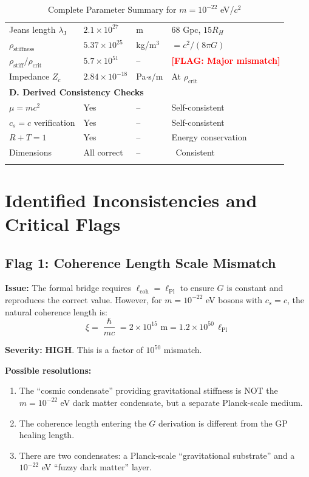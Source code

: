 \documentclass[11pt,a4paper]{article}
\newcommand{\ee}[1]{\times 10^{#1}}
\newcommand{\hbar}{\ensuremath{\hslash}}
\newcommand{\lPl}{\ensuremath{\ell_{\mathrm{Pl}}}}
\newcommand{\rhocrit}{\ensuremath{\rho_{\mathrm{crit}}}}
\newcommand{\lambdaJ}{\ensuremath{\lambda_{\mathrm{J}}}}
\newcommand{\FLAG}[1]{\textcolor{red}{\textbf{[FLAG: #1]}}}
\newcommand{\CONSISTENT}{\textcolor{green!60!black}{\checkmark~Consistent}}
\begin{document}
\begin{longtable}{@{}p{4.5cm}p{3.5cm}p{3cm}p{4cm}@{}}
Jeans length $\lambdaJ$ & $2.1 \ee{27}$ & m & 68 Gpc, $15 R_H$ \\
$\rho_{\mathrm{stiffness}}$ & $5.37 \ee{25}$ & kg/m$^3$ & $= c^2/(8\pi G)$ \\
$\rho_{\mathrm{stiff}}/\rhocrit$ & $5.7 \ee{51}$ & -- & \FLAG{Major mismatch} \\
Impedance $Z_c$ & $2.84 \ee{-18}$ & Pa$\cdot$s/m & At $\rhocrit$ \\
\midrule
\multicolumn{4}{l}{\textbf{D. Derived Consistency Checks}} \\
\midrule
$\mu = mc^2$ & Yes & -- & Self-consistent \\
$c_s = c$ verification & Yes & -- & Self-consistent \\
$R + T = 1$ & Yes & -- & Energy conservation \\
Dimensions & All correct & -- & \CONSISTENT \\
\bottomrule
\caption{Complete Parameter Summary for $m = 10^{-22}$ eV/$c^2$}
\label{tab:summary}
\end{longtable}

\section{Identified Inconsistencies and Critical Flags}
\label{sec:flags}

\subsection{Flag 1: Coherence Length Scale Mismatch}

\textbf{Issue:} The formal bridge requires $\ell_{\mathrm{coh}} = \lPl$ to ensure $G$ is constant and reproduces the correct value. However, for $m = 10^{-22}$ eV bosons with $c_s = c$, the natural coherence length is:
\begin{equation}
\xi = \frac{\hbar}{mc} = 2 \ee{15} \text{ m} = 1.2 \ee{50} \, \lPl
\end{equation}

\textbf{Severity:} \textbf{HIGH}. This is a factor of $10^{50}$ mismatch.

\textbf{Possible resolutions:}
\begin{enumerate}
    \item The ``cosmic condensate'' providing gravitational stiffness is NOT the $m = 10^{-22}$ eV dark matter condensate, but a separate Planck-scale medium.
    \item The coherence length entering the $G$ derivation is different from the GP healing length.
    \item There are two condensates: a Planck-scale ``gravitational substrate'' and a $10^{-22}$ eV ``fuzzy dark matter'' layer.
\end{enumerate}
\end{document}

